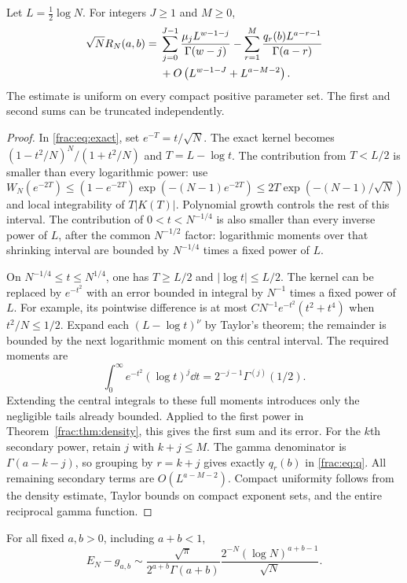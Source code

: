 \begin{theorem}
\label{frac:thm:allorders}
Let $L=\tfrac12\log N$. For integers $J\ge1$ and $M\ge0$,
\begin{align}\label{frac:eq:allorders}
 \sqrt N R_N(a,b)={}&
  \sum_{j=0}^{J-1}\frac{\mu_j L^{w-1-j}}{\Gamma(w-j)}
  -\sum_{r=1}^{M}\frac{q_r(b)L^{a-r-1}}{\Gamma(a-r)}\notag\\
 &+O\left(L^{w-1-J}+L^{a-M-2}\right).
\end{align}
The estimate is uniform on every compact positive parameter set.
The first and second sums can be truncated independently.
\end{theorem}
\begin{proof}
In \eqref{frac:eq:exact}, set $e^{-T}=t/\sqrt N$. The exact kernel
becomes $(1-t^2/N)^N/(1+t^2/N)$ and $T=L-\log t$.
The contribution from $T<L/2$ is smaller than every logarithmic
power: use
\[
 W_N(e^{-2T})\le(1-e^{-2T})
                \exp(-(N-1)e^{-2T})
 \le2T\exp(-(N-1)/\sqrt N)
\]
and local integrability of $T|K(T)|$. Polynomial growth controls the
rest of this interval. The contribution of $0<t<N^{-1/4}$ is also
smaller than every inverse power of $L$, after the common $N^{-1/2}$
factor: logarithmic moments over that shrinking interval are bounded
by $N^{-1/4}$ times a fixed power of $L$.

On $N^{-1/4}\le t\le N^{1/4}$, one has $T\ge L/2$ and
$|\log t|\le L/2$. The kernel can be replaced by $e^{-t^2}$ with
an error bounded in integral by $N^{-1}$ times a fixed power of $L$.
For example, its pointwise difference is at most
$C N^{-1}e^{-t^2}(t^2+t^4)$ when $t^2/N\le1/2$.
Expand each $(L-\log t)^\nu$ by Taylor's theorem; the remainder
is bounded by the next logarithmic moment on this central interval.
The required moments are
\[
 \int_0^\infty e^{-t^2}(\log t)^j\dd t
       =2^{-j-1}\Gamma^{(j)}(1/2).
\]
Extending the central integrals to these full moments introduces only
the negligible tails already bounded. Applied to the first power in
Theorem~\ref{frac:thm:density}, this gives the first sum and its error.
For the $k$th secondary power, retain $j$ with $k+j\le M$.
The gamma denominator is $\Gamma(a-k-j)$, so grouping by $r=k+j$
gives exactly $q_r(b)$ in \eqref{frac:eq:q}. All remaining secondary
terms are $O(L^{a-M-2})$. Compact uniformity follows from the density
estimate, Taylor bounds on compact exponent sets, and the entire
reciprocal gamma function.
\end{proof}

\begin{corollary}\label{frac:cor:leading}
For all fixed $a,b>0$, including $a+b<1$,
\begin{equation}\label{frac:eq:leading}
 E_N-g_{a,b}\sim
 \frac{\sqrt\pi}{2^{a+b}\Gamma(a+b)}
 \frac{2^{-N}(\log N)^{a+b-1}}{\sqrt N}.
\end{equation}
\end{corollary}

